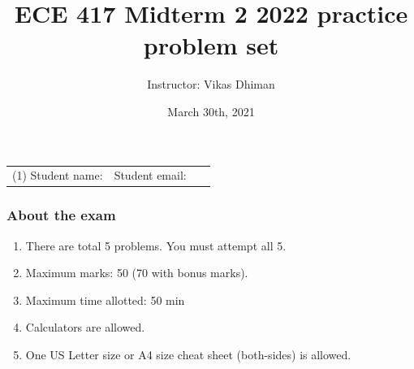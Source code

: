 \documentclass{article}
\title{ECE 417 Midterm 2 2022 practice problem set}
\date{March 30th, 2021}
\author{Instructor: Vikas Dhiman}
\begin{document}
\maketitle

\begin{tabular}{p{0.5\linewidth}p{0.5\linewidth}}
  (1) Student name:& Student email: \\
\end{tabular}

\subsubsection*{About the exam}
\begin{enumerate}
  \item There are total 5 problems. You must attempt all 5. 
  \item Maximum marks: 50 (70 with bonus marks).
  \item Maximum time allotted:  50 min
  \item Calculators are allowed.
  \item One US Letter size or A4 size cheat sheet (both-sides) is allowed.
\end{enumerate}
\end{document}
